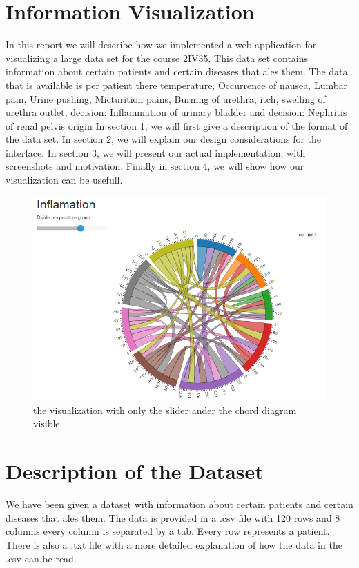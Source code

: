 \documentclass[a4paper,twoside,11pt]{article}
\begin{document}
\section*{Information Visualization}
In this report we will describe how we implemented a web application for visualizing a large data set for the course 2IV35. This data set contains information about certain patients and certain diseases that ales them. \newline
The data that is available is per patient there temperature, Occurrence of nausea, Lumbar pain, Urine pushing, Micturition pains,  Burning of urethra, itch, swelling of urethra outlet, decision: Inflammation of urinary bladder and decision: Nephritis of renal pelvis origin \newline
In section 1, we will first give a description of the format of the data set. \newline
In section 2, we will explain our design considerations for the interface. \newline
In section 3, we will present our actual implementation, with screenshots and motivation. \newline
Finally in section 4, we will show how our visualization can be usefull. \newline
\begin{figure}[h]
    \includegraphics[width=\textwidth]{images/chordDiagram.PNG}
    \caption{the visualization with only the slider ander the chord diagram visible}
    \label{fig:overView}
\end{figure}
\newpage
\section{Description of the Dataset}
We have been given a dataset with information about certain patients and certain diseases that ales them. The data is provided in a .csv file with 120 rows and 8 columns every column is separated by a tab. Every row represents a patient. There is also a .txt file with a more detailed explanation of how the data in the .csv can be read.
\end{document}
